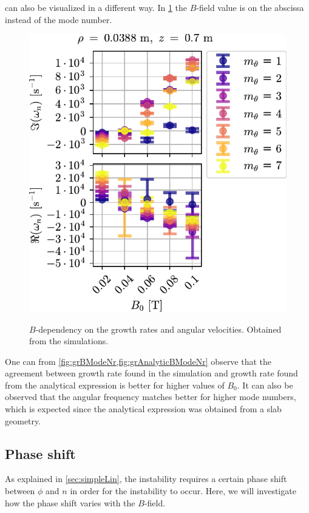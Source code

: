  can also be visualized in a different way.
In \cref{fig:grBModeNr} the $B$-field value is on the abscissa instead of the mode number.
%
\begin{figure}[htb]
        \centering
        \includegraphics{fig/results/growthRates/growthRatesB0ModeNr}
        \label{fig:grBModeNr}
        \caption{$B$-dependency on the growth rates and angular velocities.
            Obtained from the simulations.}
\end{figure}
%
One can from \cref{fig:grBModeNr,fig:grAnalyticBModeNr} observe that the agreement between growth rate found in the simulation and growth rate found from the analytical expression is better for higher values of $B_0$.
It can also be observed that the angular frequency matches better for higher mode numbers, which is expected since the analytical expression was obtained from a slab geometry.

\subsection{Phase shift}
%
As explained in \ref{sec:simpleLin}, the instability requires a certain phase shift between $\phi$ and $n$ in order for the instability to occur.
Here, we will investigate how the phase shift varies with the $B$-field.

